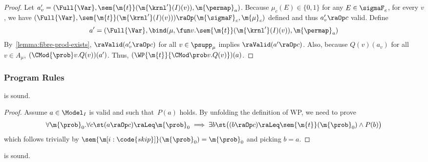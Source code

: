 \begin{proof}
  Let $a'_v =  (\Full{\Var}, \sem{\m{t}} (\m{\krnl'}(I)(v)), \m{\permap}_{a})$.
  Because $\mu_c(E) \in \{0, 1\}$ for any $E \in \sigmaF_c$, for every $v$,
  we have $ (\Full{\Var}, \sem{\m{t}} (\m{\krnl'}(I)(v)))  \raOp (\m{\sigmaF}_c, \m{\mu}_c)$
  defined and thus
  $a'_v \raOp c$ valid.
  Define
  \[
    a' =
     (\Full{\Var},
      \bind(\mu, \fun v . \sem{\m{t}} (\m{\krnl'}(I)(v)),
      \m{\permap}_a)
  \]
  By~\cref{lemma:fibre-prod-exists},
  $ \raValid(a'_v \raOp c)$ for all $v \in \psupp_{\mu}$ implies
  $\raValid(a' \raOp c)$.
  Also, because  $Q(v)(a_v)$ for all $v \in A_{\mu}$,
  $(\CMod{\prob} v. Q(v))(a') $.
Thus, $(\WP {\m{t}}{\CMod\prob v. {Q(v)}}) (a)$.
\end{proof}
 
\subsubsection{Program Rules}
\begin{lemma}
\label{proof:wp-skip}
   is sound.
\end{lemma}

\begin{proof}
  Assume $a \in \Model_I$ is valid and such that~$P(a)$ holds.
  By unfolding the definition of WP, we need to prove
  \[
    \forall \m{\prob}_0.
      \forall c \st
      (a \raOp c) \raLeq \m{\prob}_0
      \implies
      \exists b \st
      \bigl(
        (b \raOp c) \raLeq \sem{\m{t}}(\m{\prob}_0)
        \land
        P(b)
      \bigr)
  \]
  which follows trivially
  by $\sem{\m[i:\code{skip}]}(\m{\prob}_0)=\m{\prob}_0$ and picking $b=a$.
\end{proof}
 \begin{lemma}
\label{proof:wp-seq}
   is sound.
\end{lemma}

